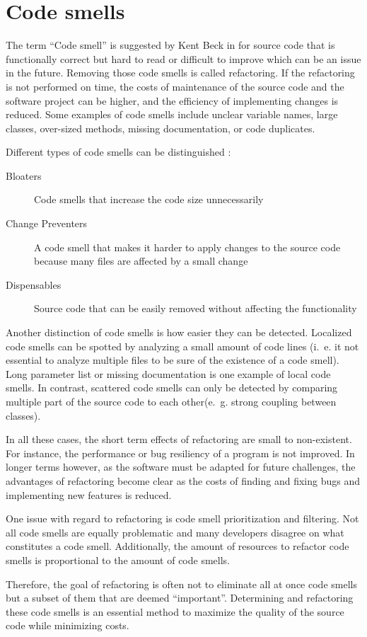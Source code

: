 \section{Code smells}\label{sec:code_smell}

The term \enquote{Code smell} is suggested by Kent Beck in \cite{fowler2019refactoring} for source code that is functionally correct but hard to read or difficult to improve which can be an issue in the future. Removing those code smells is called refactoring. If the refactoring is not performed on time, the costs of maintenance of the source code and the software project can be higher, and the efficiency of implementing changes is reduced. Some examples of code smells include unclear variable names, large classes, over-sized methods, missing documentation, or code duplicates. 

Different types of code smells can be distinguished \cite{data_clumps_refactoring_guru}:
\begin{description}
    \item [Bloaters] Code smells that increase the code size unnecessarily 
    \item [Change Preventers] A code smell that makes it harder to apply changes to the source code because many files are affected by a small change
    \item [Dispensables] Source code that can be easily removed without affecting the functionality
\end{description}

Another distinction of code smells is how easier they can be detected. Localized code smells can be spotted by analyzing a small amount of code lines (i.~e. it not essential to analyze multiple files to be sure of the existence of a code smell). Long parameter list or missing documentation is one example of local code smells.  In contrast, scattered code smells can only be detected by comparing multiple part of the source code to each other(e.~g. strong coupling between classes). \cite{10.1007/978-3-030-29238-6_19}

In all these cases, the short term effects of refactoring are small to non-existent. For instance, the performance or bug resiliency of a program is not improved. In longer terms however, as the software must be adapted for future challenges, the advantages of refactoring become clear as the costs of finding and fixing bugs and implementing new features is reduced. 

One issue with regard to refactoring is code smell prioritization and filtering. Not all code smells are equally problematic and many developers disagree on what constitutes a code smell. Additionally,  the amount of resources to refactor code smells is proportional to the amount of code smells. \cite{10.1007/978-981-13-8300-7_21}

Therefore, the goal of refactoring is often not to eliminate all at once code smells but a subset of them that are deemed \enquote{important}. Determining and refactoring these code smells is an essential method to maximize the quality of the source code while minimizing costs.